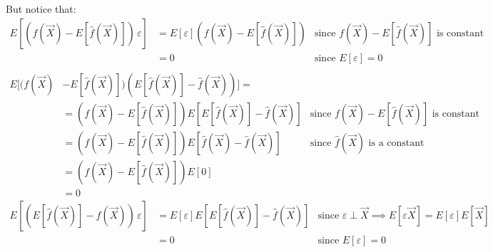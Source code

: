       But notice that:
      \begin{align*}
        E[(f(\vec{X}) - E[\hat{f}(\vec{X})])\,\varepsilon] 
        & = E[\varepsilon](f(\vec{X}) - E[\hat{f}(\vec{X})]) 
        & \text{since } f(\vec{X}) - E[\hat{f}(\vec{X})] \text{ is constant}\\
        & = 0
        & \text{since } E[\varepsilon] = 0 \\
      \end{align*}
      \begin{align*}
        E[(f(\vec{X}) & - E[\hat{f}(\vec{X})])(E[\hat{f}(\vec{X})] - \hat{f}(\vec{X}))] = \\
                      & = (f(\vec{X}) - E[\hat{f}(\vec{X})])E[E[\hat{f}(\vec{X})] - \hat{f}(\vec{X})]
                      & \text{since } f(\vec{X}) - E[\hat{f}(\vec{X})] \text{ is constant} \\
                      & = (f(\vec{X}) - E[\hat{f}(\vec{X})])E[ \hat{f}(\vec{X}) - \hat{f}(\vec{X})]
                      & \text{since } \hat{f}(\vec{X}) \text{ is a constant} \\
                      & = (f(\vec{X}) - E[\hat{f}(\vec{X})])E[0] \\
                      & = 0
      \end{align*}
      \begin{align*}
        E[(E[\hat{f}(\vec{X})] - \hat{f}(\vec{X}))\,\varepsilon]
        & = E[\varepsilon]E[E[\hat{f}(\vec{X})] - \hat{f}(\vec{X})]
        & \text{since } \varepsilon \perp \vec{X} \implies E[\varepsilon\vec{X}] = E[\varepsilon]E[\vec{X}]\\
        & = 0
        & \text{since } E[\varepsilon] = 0 \\
      \end{align*}
      
